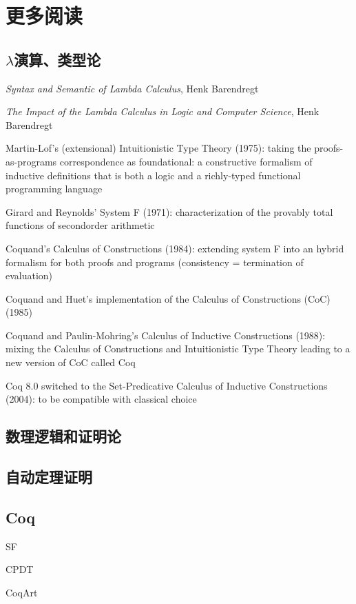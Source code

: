 \section{更多阅读}

\subsection{$\lambda$演算、类型论}


\emph{Syntax and Semantic of Lambda Calculus}, Henk Barendregt

\emph{The Impact of the Lambda Calculus in Logic and Computer Science}, Henk Barendregt

Martin-Lof’s (extensional) Intuitionistic Type Theory (1975): taking the proofs-as-programs correspondence
as foundational: a constructive formalism of inductive definitions that is both a logic
and a richly-typed functional programming language

Girard and Reynolds’ System F (1971): characterization of the provably total functions of secondorder
arithmetic

Coquand’s Calculus of Constructions (1984): extending system F into an hybrid formalism for
both proofs and programs (consistency = termination of evaluation)

Coquand and Huet’s implementation of the Calculus of Constructions (CoC) (1985)

Coquand and Paulin-Mohring’s Calculus of Inductive Constructions (1988): mixing the Calculus
of Constructions and Intuitionistic Type Theory leading to a new version of CoC called Coq

Coq 8.0 switched to the Set-Predicative Calculus of Inductive Constructions (2004): to be compatible
with classical choice


\subsection{数理逻辑和证明论}





\subsection{自动定理证明}


\subsection{Coq}
SF

CPDT

CoqArt